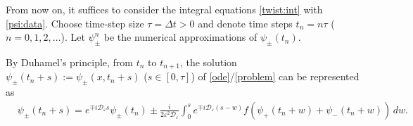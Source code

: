 \documentclass[final,leqno,showlabe]{siamltex}
\begin{document}
From now on, it suffices to consider the integral equations \eqref{twist:int} with \eqref{psi:data}. Choose time-step size $\tau=\Delta t>0$ and denote time steps $t_n=n\tau$ ($n=0,1,2,\dots$).
Let $\psi_\pm^n$ be the numerical approximations of $\psi_\pm(t_n)$.

By Duhamel's principle, from $t_n$ to $t_{n+1}$,
the solution $\psi_\pm(t_n+s):=\psi_\pm(x,t_n+s)$ ($s\in[0,\tau]$) of \eqref{ode}/\eqref{problem} can be represented as
\begin{align}\label{es1}
&\psi_\pm(t_n+s)=e^{\mp i\mathcal{D}_{\varepsilon} s}\psi_{\pm}(t_n)\pm \frac{i}{2\varepsilon^2\mathcal{D}_{\varepsilon} }\int_0^s e^{\mp i \mathcal{D}_\varepsilon (s-w)} f(\psi_+(t_n+w)+\psi_-(t_n+w))\,dw.
\end{align}

\end{document}
